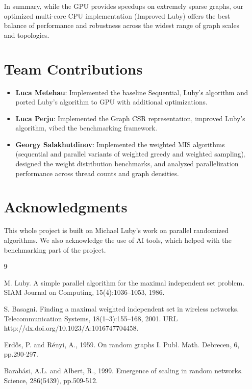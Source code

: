 \documentclass{article}
\begin{document}
In summary, while the GPU provides speedups on extremely sparse graphs, our optimized multi-core CPU implementation (Improved Luby) offers the best balance of performance and robustness across the widest range of graph scales and topologies.

\section*{Team Contributions}

\begin{itemize}
    \item \textbf{Luca Metehau}: Implemented the baseline Sequential, Luby's algorithm and ported Luby's algorithm to GPU with additional optimizations.
    \item \textbf{Luca Perju}: Implemented the Graph CSR representation, improved Luby's algorithm, vibed the benchmarking framework.
    \item \textbf{Georgy Salakhutdinov}: Implemented the weighted MIS algorithms (sequential and parallel variants of weighted greedy and weighted sampling), designed the weight distribution benchmarks, and analyzed parallelization performance across thread counts and graph densities.
\end{itemize}

\section*{Acknowledgments}

This whole project is built on Michael Luby's work on parallel randomized algorithms.
We also acknowledge the use of AI tools, which helped with the benchmarking part of the project.


\begin{thebibliography}{9}

    M. Luby. A simple parallel algorithm for the maximal independent set problem. SIAM Journal on Computing, 15(4):1036--1053, 1986.

    S. Basagni. Finding a maximal weighted independent set in wireless networks. Telecommunication Systems, 18(1–3):155–168, 2001. URL http://dx.doi.org/10.1023/A:1016747704458.

    Erdős, P. and Rényi, A., 1959. On random graphs I. Publ. Math. Debrecen, 6, pp.290-297.

    Barabási, A.L. and Albert, R., 1999. Emergence of scaling in random networks. Science, 286(5439), pp.509-512.

\end{thebibliography}
\end{document}

